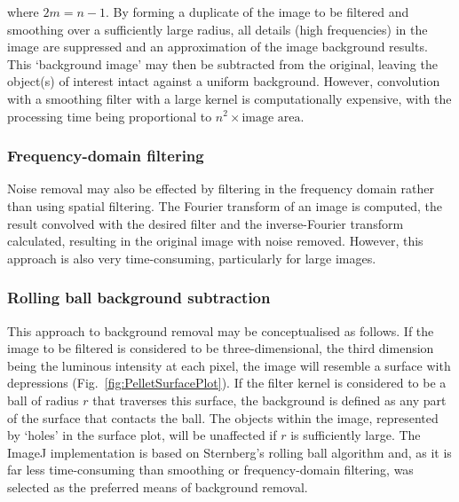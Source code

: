 \noindent where $2m=n-1$. By forming a duplicate of the image to be filtered and smoothing over a sufficiently large radius, all details (high frequencies) in the image are suppressed and an approximation of the image background results. This \lq background image' may then be subtracted from the original, leaving the object(s) of interest intact against a uniform background. However, convolution with a smoothing filter with a large kernel is computationally expensive, with the processing time being proportional to $n^2 \times \mbox{image area}$.

\subsubsection{Frequency-domain filtering}

Noise removal may also be effected by filtering in the frequency domain rather than using spatial filtering. The Fourier transform of an image is computed, the result convolved with the desired filter and the inverse-Fourier transform calculated, resulting in the original image with noise removed. However, this approach is also very time-consuming, particularly for large images.

\subsubsection{Rolling ball background subtraction}

This approach to background removal may be conceptualised as follows. If the image to be filtered is considered to be three-dimensional, the third dimension being the luminous intensity at each pixel, the image will resemble a surface with depressions (Fig.~\ref{fig:PelletSurfacePlot}). If the filter kernel is considered to be a ball of radius $r$ that traverses this surface, the background is defined as any part of the surface that contacts the ball. The objects within the image, represented by \lq holes' in the surface plot, will be unaffected if $r$ is sufficiently large. The ImageJ implementation is based on Sternberg's rolling ball algorithm \cite{sternberg1983} and, as it is far less time-consuming than smoothing or frequency-domain filtering, was selected as the preferred means of background removal.

